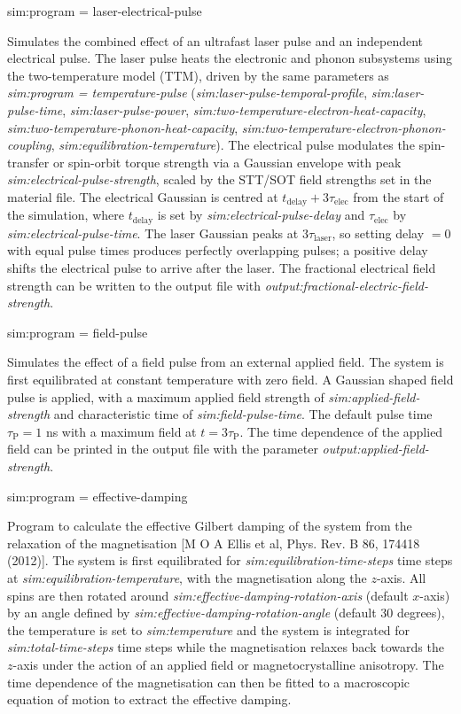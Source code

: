 {\zicf sim:program = laser-electrical-pulse}
Simulates the combined effect of an ultrafast laser pulse and an independent electrical pulse.
The laser pulse heats the electronic and phonon subsystems using the two-temperature model (TTM),
driven by the same parameters as \textit{sim:program = temperature-pulse}
(\textit{sim:laser-pulse-temporal-profile}, \textit{sim:laser-pulse-time}, \textit{sim:laser-pulse-power},
\textit{sim:two-temperature-electron-heat-capacity}, \textit{sim:two-temperature-phonon-heat-capacity},
\textit{sim:two-temperature-electron-phonon-coupling}, \textit{sim:equilibration-temperature}).
The electrical pulse modulates the spin-transfer or spin-orbit torque strength via a Gaussian envelope
with peak \textit{sim:electrical-pulse-strength},
scaled by the STT/SOT field strengths set in the material file.
The electrical Gaussian is centred at $t_\mathrm{delay} + 3\tau_\mathrm{elec}$ from the start of the simulation,
where $t_\mathrm{delay}$ is set by \textit{sim:electrical-pulse-delay} and $\tau_\mathrm{elec}$ by
\textit{sim:electrical-pulse-time}.
The laser Gaussian peaks at $3\tau_\mathrm{laser}$, so setting delay $= 0$ with equal pulse times produces
perfectly overlapping pulses; a positive delay shifts the electrical pulse to arrive after the laser.
The fractional electrical field strength can be written to the output file with
\textit{output:fractional-electric-field-strength}.

{\zicf sim:program = field-pulse}
Simulates the effect of a field pulse from an external applied field. The
system is first equilibrated at constant temperature with zero field. A
Gaussian shaped field pulse is applied, with a maximum applied field strength of
\textit{sim:applied-field-strength} and characteristic time of
\textit{sim:field-pulse-time}. The default pulse time $\tau_\mathrm{P} = 1$ ns
with a maximum field at $t = 3\tau_\mathrm{P}$. The time dependence of the
applied field can be printed in the output file with the parameter
\textit{output:applied-field-strength}.

{\zicf sim:program = effective-damping}
Program to calculate the effective Gilbert damping of the system from the
relaxation of the magnetisation [M O A Ellis et al, Phys. Rev. B 86, 174418 (2012)].
The system is first equilibrated for \textit{sim:equilibration-time-steps} time
steps at \textit{sim:equilibration-temperature}, with the magnetisation along
the $z$-axis. All spins are then rotated around
\textit{sim:effective-damping-rotation-axis} (default $x$-axis) by an angle
defined by \textit{sim:effective-damping-rotation-angle} (default 30 degrees),
the temperature is set to \textit{sim:temperature} and the system is integrated
for \textit{sim:total-time-steps} time steps while the magnetisation relaxes
back towards the $z$-axis under the action of an applied field or
magnetocrystalline anisotropy. The time dependence of the magnetisation can
then be fitted to a macroscopic equation of motion to extract the effective
damping.

